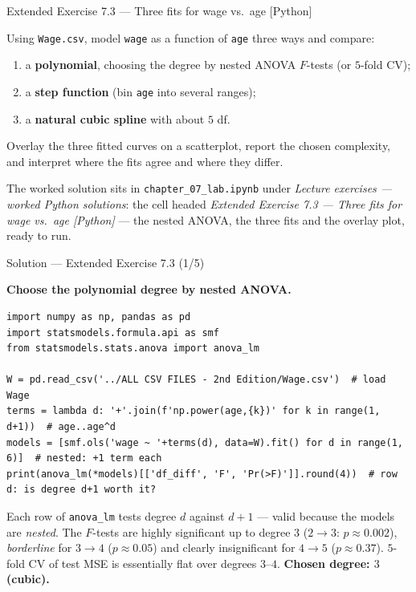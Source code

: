 \documentclass[aspectratio=169,11pt]{beamer}
\begin{document}
\begin{frame}{Extended Exercise 7.3 --- Three fits for wage vs.\ age [Python]}
\begin{longexercise}
Using \texttt{Wage.csv}, model \texttt{wage} as a function of \texttt{age} three ways and compare:
\begin{enumerate}
  \item a \textbf{polynomial}, choosing the degree by nested ANOVA $F$-tests (or $5$-fold CV);
  \item a \textbf{step function} (bin \texttt{age} into several ranges);
  \item a \textbf{natural cubic spline} with about $5$ df.
\end{enumerate}
Overlay the three fitted curves on a scatterplot, report the chosen complexity, and interpret where the fits agree and where they differ.
\end{longexercise}
\begin{labnote}
The worked solution sits in \texttt{chapter\_07\_lab.ipynb} under \emph{Lecture exercises --- worked Python solutions}: the cell headed \emph{Extended Exercise 7.3 --- Three fits for wage vs.\ age [Python]} --- the nested ANOVA, the three fits and the overlay plot, ready to run.
\end{labnote}
\end{frame}

\begin{frame}[fragile]{Solution --- Extended Exercise 7.3 (1/5)}
\begin{solutionbox}
\textbf{Choose the polynomial degree by nested ANOVA.}
\begin{lstlisting}[basicstyle=\ttfamily\scriptsize]
import numpy as np, pandas as pd
import statsmodels.formula.api as smf
from statsmodels.stats.anova import anova_lm

W = pd.read_csv('../ALL CSV FILES - 2nd Edition/Wage.csv')  # load Wage
terms = lambda d: '+'.join(f'np.power(age,{k})' for k in range(1, d+1))  # age..age^d
models = [smf.ols('wage ~ '+terms(d), data=W).fit() for d in range(1, 6)]  # nested: +1 term each
print(anova_lm(*models)[['df_diff', 'F', 'Pr(>F)']].round(4))  # row d: is degree d+1 worth it?
\end{lstlisting}
Each row of \texttt{anova\_lm} tests degree $d$ against $d{+}1$ --- valid because the models are \emph{nested}. The $F$-tests are highly significant up to degree $3$ ($2\!\to\!3$: $p\approx0.002$), \emph{borderline} for $3\!\to\!4$ ($p\approx0.05$) and clearly insignificant for $4\!\to\!5$ ($p\approx0.37$). $5$-fold CV of test MSE is essentially flat over degrees $3$--$4$. \textbf{Chosen degree: $3$ (cubic).}
\end{solutionbox}
\end{frame}
\end{document}
